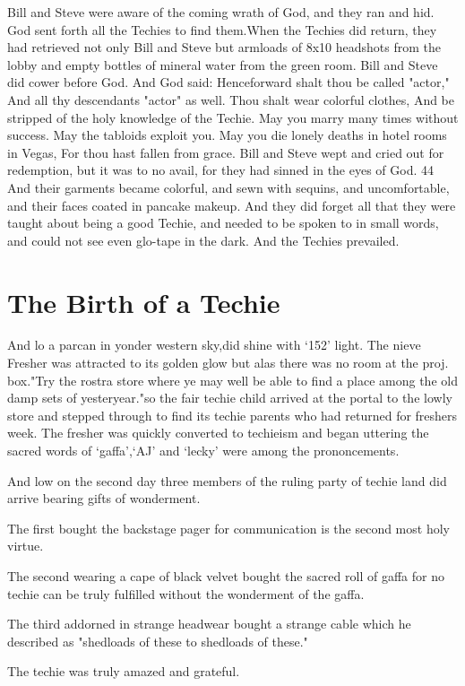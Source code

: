 \documentclass[10pt,a4paper,oneside]{article}
\begin{document}
Bill and Steve were aware of the coming wrath of God, and they ran and hid. God sent forth all the Techies to find them.When the Techies did return, they had retrieved not only Bill and Steve but armloads of 8x10 headshots from the lobby and empty bottles of mineral water from the green room. Bill and Steve did cower before God. And God said: Henceforward shalt thou be called "actor," And all thy descendants "actor" as well. Thou shalt wear colorful clothes, And be stripped of the holy knowledge of the Techie. May you marry many times without success. May the tabloids exploit you. May you die lonely deaths in hotel rooms in Vegas, For thou hast fallen from grace. Bill and Steve wept and cried out for redemption, but it was to no avail, for they had sinned in the eyes of God. 44 And their garments became colorful, and sewn with sequins, and uncomfortable, and their faces coated in pancake makeup. And they did forget all that they were taught about being a good Techie, and needed to be spoken to in small words, and could not see even glo-tape in the dark. And the Techies prevailed.

\section{The Birth of a Techie}
And lo a parcan in yonder western sky,did shine with `152' light. The nieve Fresher was attracted to its golden glow but alas there was no room at the proj. box."Try the rostra store where ye may well be able to find a place among the old damp sets of yesteryear."so the fair techie child arrived at the portal to the lowly store and stepped through to find its techie parents who had returned for freshers week. The fresher was quickly converted to techieism and began uttering the sacred words of `gaffa',`AJ' and `lecky' were among the prononcements. 

And low on the second day three members of the ruling party of techie land did arrive bearing gifts of wonderment.

The first bought the backstage pager for communication is the second most holy virtue. 

The second wearing a cape of black velvet bought the sacred roll of gaffa for no techie can be truly fulfilled without the wonderment of the gaffa. 

The third addorned in strange headwear bought a strange cable which he described as "shedloads of these to shedloads of these." 

The techie was truly amazed and grateful. 
\end{document}
